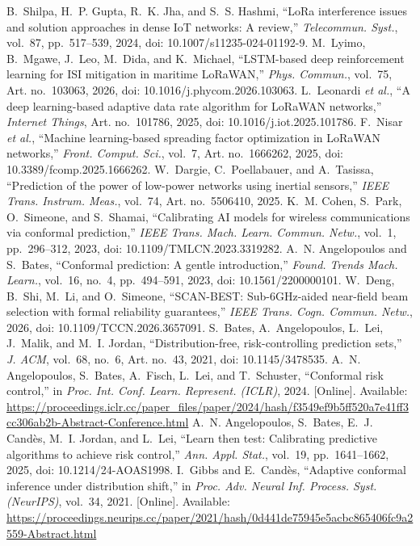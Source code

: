  B.~Shilpa, H.~P. Gupta, R.~K. Jha, and S.~S. Hashmi, ``LoRa interference issues and solution approaches in dense IoT networks: A review,'' \emph{Telecommun. Syst.}, vol.~87, pp.~517--539, 2024, doi: 10.1007/s11235-024-01192-9.
 M.~Lyimo, B.~Mgawe, J.~Leo, M.~Dida, and K.~Michael, ``LSTM-based deep reinforcement learning for ISI mitigation in maritime LoRaWAN,'' \emph{Phys. Commun.}, vol.~75, Art. no.~103063, 2026, doi: 10.1016/j.phycom.2026.103063.
 L.~Leonardi \emph{et al.}, ``A deep learning-based adaptive data rate algorithm for LoRaWAN networks,'' \emph{Internet Things}, Art. no.~101786, 2025, doi: 10.1016/j.iot.2025.101786.
 F.~Nisar \emph{et al.}, ``Machine learning-based spreading factor optimization in LoRaWAN networks,'' \emph{Front. Comput. Sci.}, vol.~7, Art. no.~1666262, 2025, doi: 10.3389/fcomp.2025.1666262.
 W.~Dargie, C.~Poellabauer, and A.~Tasissa, ``Prediction of the power of low-power networks using inertial sensors,'' \emph{IEEE Trans. Instrum. Meas.}, vol.~74, Art. no.~5506410, 2025.
 K.~M. Cohen, S.~Park, O.~Simeone, and S.~Shamai, ``Calibrating AI models for wireless communications via conformal prediction,'' \emph{IEEE Trans. Mach. Learn. Commun. Netw.}, vol.~1, pp.~296--312, 2023, doi: 10.1109/TMLCN.2023.3319282.
 A.~N. Angelopoulos and S.~Bates, ``Conformal prediction: A gentle introduction,'' \emph{Found. Trends Mach. Learn.}, vol.~16, no.~4, pp.~494--591, 2023, doi: 10.1561/2200000101.
 W.~Deng, B.~Shi, M.~Li, and O.~Simeone, ``SCAN-BEST: Sub-6GHz-aided near-field beam selection with formal reliability guarantees,'' \emph{IEEE Trans. Cogn. Commun. Netw.}, 2026, doi: 10.1109/TCCN.2026.3657091.
 S.~Bates, A.~Angelopoulos, L.~Lei, J.~Malik, and M.~I. Jordan, ``Distribution-free, risk-controlling prediction sets,'' \emph{J. ACM}, vol.~68, no.~6, Art. no.~43, 2021, doi: 10.1145/3478535.
 A.~N. Angelopoulos, S.~Bates, A.~Fisch, L.~Lei, and T.~Schuster, ``Conformal risk control,'' in \emph{Proc. Int. Conf. Learn. Represent. (ICLR)}, 2024. [Online]. Available: \url{https://proceedings.iclr.cc/paper_files/paper/2024/hash/f3549ef9b5ff520a7e41ff3cc306ab2b-Abstract-Conference.html}
 A.~N. Angelopoulos, S.~Bates, E.~J. Cand\`es, M.~I. Jordan, and L.~Lei, ``Learn then test: Calibrating predictive algorithms to achieve risk control,'' \emph{Ann. Appl. Stat.}, vol.~19, pp.~1641--1662, 2025, doi: 10.1214/24-AOAS1998.
 I.~Gibbs and E.~Cand\`es, ``Adaptive conformal inference under distribution shift,'' in \emph{Proc. Adv. Neural Inf. Process. Syst. (NeurIPS)}, vol.~34, 2021. [Online]. Available: \url{https://proceedings.neurips.cc/paper/2021/hash/0d441de75945e5acbc865406fc9a2559-Abstract.html}
